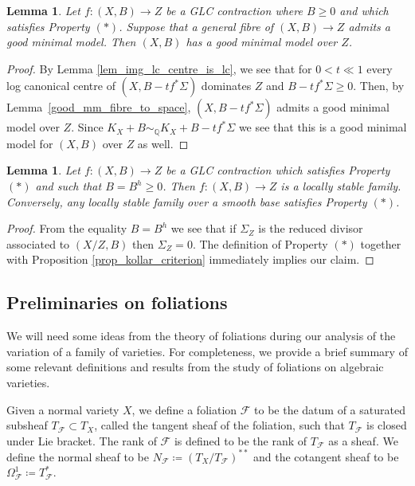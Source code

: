 \documentclass[12pt]{amsart}
\theoremstyle{plain}
\newtheorem{lemma}[theorem]{Lemma}
\theoremstyle{definition}
\begin{document}
\begin{lemma}
\label{lem_gen_fibre_min_model}
Let $f\colon (X, B)\rightarrow Z$ be a GLC contraction where $B \geq 0$ and 
which satisfies Property $(*)$.
Suppose that a general fibre of $(X, B) \rightarrow Z$ admits a good minimal model.  
Then $(X, B)$ has a good minimal
model over $Z$.
\end{lemma}

\begin{proof}
By Lemma \ref{lem_img_lc_centre_is_lc}, we see that for $0<t\ll 1$ every log canonical centre of $(X, B-tf^*\Sigma)$ 
dominates $Z$ and $B-tf^*\Sigma \geq 0$.
Then, by Lemma~\ref{good_mm_fibre_to_space}, $(X, B-tf^*\Sigma)$ admits a good minimal model over $Z$.
Since $K_{X}+B \sim_{\mathbb Q} K_{X}+B-tf^*\Sigma$ we see that this is a 
good minimal model for $(X, B)$ over $Z$ as well.
\end{proof}


\begin{lemma}
\label{lem_prop*_horz_semi-stable}
Let $f\colon (X, B)\rightarrow Z$ be a GLC contraction which satisfies Property $(*)$ 
and such that $B=B^h \geq 0$.
Then $f\colon (X, B)\rightarrow Z$ is a locally stable family.
Conversely, any locally stable family over a smooth base satisfies Property $(*)$.
\end{lemma}
\begin{proof}
From the equality $B = B^h$ we see that if $\Sigma_Z$ is the reduced divisor associated
to $(X/Z, B)$ then $\Sigma_Z = 0$.  The definition of Property $(*)$ together 
with Proposition \ref{prop_kollar_criterion}
immediately implies our claim.
\end{proof}







\subsection{Preliminaries on foliations}

We will need some ideas from the theory of foliations during our analysis of the variation of a family
of varieties.  For completeness, we provide a brief summary of some relevant definitions and results from
the study of foliations on algebraic varieties.

Given a normal variety $X$, we define a foliation $\mathcal F$ to be the datum
of a saturated subsheaf $T_{\mathcal F} \subset T_X$, called the tangent sheaf of the foliation,
such that $T_{\mathcal F}$ is closed under Lie bracket.
The rank of $\mathcal F$ is defined to be the rank of $T_{\mathcal F}$
as a sheaf.
We define the normal sheaf to be $N_{\mathcal F} \coloneqq (T_X/T_{\mathcal F})^{**}$ and the cotangent sheaf to
be $\Omega^1_{\mathcal F} \coloneqq T_{\mathcal F}^*$.
\end{document}
